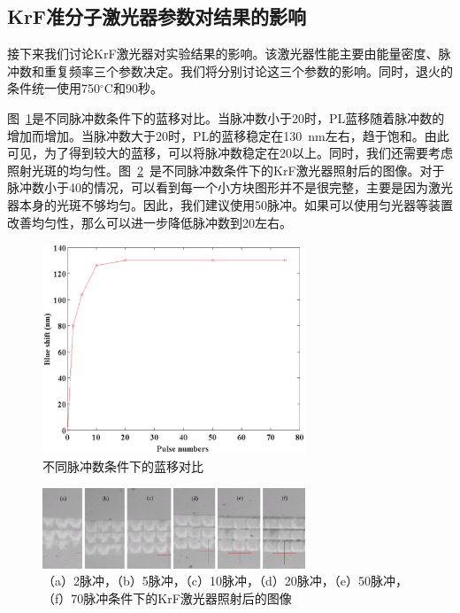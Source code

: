 \documentclass{ZJUthesis}
\begin{document}
\subsection{KrF准分子激光器参数对结果的影响}

接下来我们讨论KrF激光器对实验结果的影响。该激光器性能主要由能量密度、脉冲数和重复频率三个参数决定。我们将分别讨论这三个参数的影响。同时，退火的条件统一使用750$^{\circ}$C和90秒。

图~\ref{fig_qwi_pulse}是不同脉冲数条件下的蓝移对比。当脉冲数小于20时，PL蓝移随着脉冲数的增加而增加。当脉冲数大于20时，PL的蓝移稳定在130~nm左右，趋于饱和。由此可见，为了得到较大的蓝移，可以将脉冲数稳定在20以上。同时，我们还需要考虑照射光斑的均匀性。图~\ref{fig_qwi_pulse2}~是不同脉冲数条件下的KrF激光器照射后的图像。对于脉冲数小于40的情况，可以看到每一个小方块图形并不是很完整，主要是因为激光器本身的光斑不够均匀。因此，我们建议使用50脉冲。如果可以使用匀光器等装置改善均匀性，那么可以进一步降低脉冲数到20左右。

\begin{figure}[htbp]
    \centering
    \includegraphics[width=0.7\textwidth]{./Pictures/qwi_pulse.eps}
    \caption{不同脉冲数条件下的蓝移对比}
    \label{fig_qwi_pulse}
\end{figure}

\begin{figure}[htbp]
    \centering
    \includegraphics[width=0.7\textwidth]{./Pictures/qwi_pulse2.eps}
    \caption{（a）2脉冲，（b）5脉冲，（c）10脉冲，（d）20脉冲，（e）50脉冲，（f）70脉冲条件下的KrF激光器照射后的图像}
    \label{fig_qwi_pulse2}
\end{figure}
\end{document}
